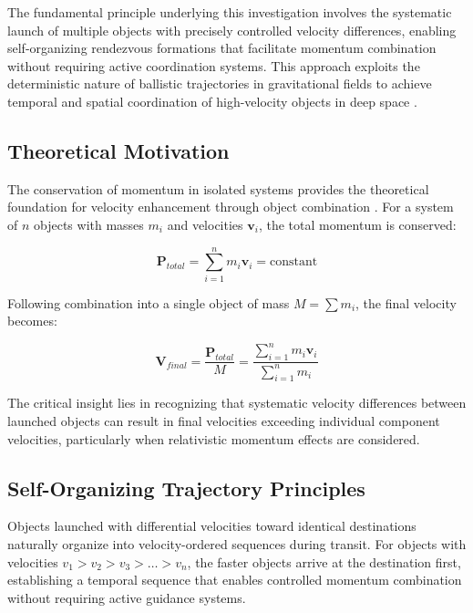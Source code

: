 \documentclass[11pt,a4paper]{article}
\theoremstyle{remark}
\begin{document}
The fundamental principle underlying this investigation involves the systematic launch of multiple objects with precisely controlled velocity differences, enabling self-organizing rendezvous formations that facilitate momentum combination without requiring active coordination systems. This approach exploits the deterministic nature of ballistic trajectories in gravitational fields to achieve temporal and spatial coordination of high-velocity objects in deep space \cite{goldstein2002classical}.

\subsection{Theoretical Motivation}

The conservation of momentum in isolated systems provides the theoretical foundation for velocity enhancement through object combination \cite{taylor2005classical}. For a system of $n$ objects with masses $m_i$ and velocities $\mathbf{v}_i$, the total momentum is conserved:

\begin{equation}
\mathbf{P}_{total} = \sum_{i=1}^{n} m_i \mathbf{v}_i = \text{constant}
\label{eq:momentum_conservation}
\end{equation}

Following combination into a single object of mass $M = \sum m_i$, the final velocity becomes:

\begin{equation}
\mathbf{V}_{final} = \frac{\mathbf{P}_{total}}{M} = \frac{\sum_{i=1}^{n} m_i \mathbf{v}_i}{\sum_{i=1}^{n} m_i}
\label{eq:final_velocity}
\end{equation}

The critical insight lies in recognizing that systematic velocity differences between launched objects can result in final velocities exceeding individual component velocities, particularly when relativistic momentum effects are considered.

\subsection{Self-Organizing Trajectory Principles}

Objects launched with differential velocities toward identical destinations naturally organize into velocity-ordered sequences during transit. For objects with velocities $v_1 > v_2 > v_3 > \ldots > v_n$, the faster objects arrive at the destination first, establishing a temporal sequence that enables controlled momentum combination without requiring active guidance systems.
\end{document}
